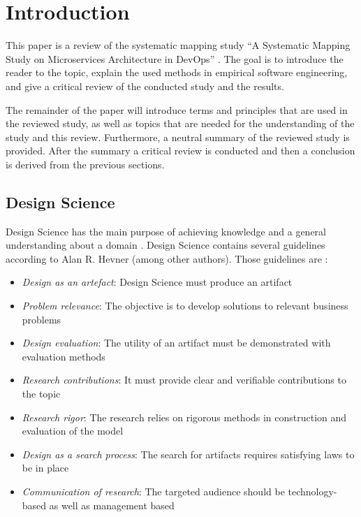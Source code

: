 \section{Introduction}

This paper is a review of the systematic mapping study
``A Systematic Mapping Study on Microservices Architecture in DevOps'' \cite{waseem:SMSMSADevOps}.
The goal is to introduce the reader to the topic, explain the used
methods in empirical software engineering, and give a critical review
of the conducted study and the results.


The remainder of the paper will introduce terms and principles that are used
in the reviewed study, as well as topics that are needed for the understanding
of the study and this review. Furthermore, a neutral summary of the reviewed study
\cite{waseem:SMSMSADevOps} is provided. After the summary a critical review
is conducted and then a conclusion is derived from the previous sections.


\subsection{Design Science}

Design Science has the main purpose of achieving knowledge and a general understanding
about a domain \cite{hevner:DesignScience}. Design Science contains several guidelines
according to Alan R. Hevner (among other authors). Those guidelines are \cite{hevner:DesignScience}:

\begin{itemize}
    \item \textit{Design as an artefact}: Design Science must produce an artifact
    \item \textit{Problem relevance}: The objective is to develop solutions to relevant business problems
    \item \textit{Design evaluation}: The utility of an artifact must be demonstrated with evaluation methods
    \item \textit{Research contributions}: It must provide clear and verifiable contributions to the topic
    \item \textit{Research rigor}: The research relies on rigorous methods in construction and evaluation of the model
    \item \textit{Design as a search process}: The search for artifacts requires satisfying laws to be in place
    \item \textit{Communication of research}: The targeted audience should be technology-based as well as management based
\end{itemize}



